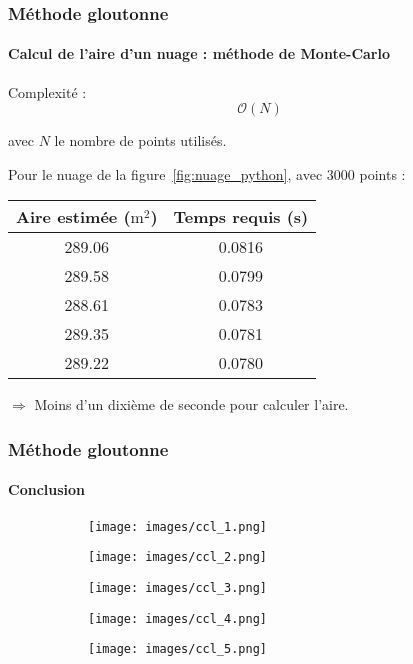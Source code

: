 \documentclass{beamer}
\begin{document}
\begin{frame}
	\frametitle{Méthode gloutonne}
	\framesubtitle{Calcul de l'aire d'un nuage : méthode de Monte-Carlo}
	Complexité : \[\mathcal{O}(N)\]
	\begin{flushright}
		avec $N$ le nombre de points utilisés.
	\end{flushright}
	Pour le nuage de la figure~\ref{fig:nuage_python}, avec $ 3000 $ points : 
	\begin{center}
		\begin{tabular}{c|c}
		Aire estimée ($\text{m}^2$) & Temps requis (s) \\ \hline \hline 
		289.06 & 0.0816 \\ 
		289.58 & 0.0799 \\ 
		288.61 & 0.0783 \\
		289.35 & 0.0781 \\
		289.22 & 0.0780 \\
	\end{tabular}
	\end{center}
	\begin{flushright}
		\small $\Rightarrow$ Moins d'un dixième de seconde pour calculer l'aire.
	\end{flushright}
\end{frame}


\begin{frame}
	\frametitle{Méthode gloutonne}
	\framesubtitle{Conclusion}
	\begin{figure}[!htb]
			\centering 
			\begin{subfigure}{0.25\textwidth}
				\centering 
				\texttt{[image: images/ccl\_1.png]}
			\end{subfigure}
			\hspace*{\fill}
			\begin{subfigure}{0.25\textwidth}
				\centering 
				\texttt{[image: images/ccl\_2.png]}
			\end{subfigure}
			\hspace*{\fill}
			\begin{subfigure}{0.25\textwidth}
				\centering 
				\texttt{[image: images/ccl\_3.png]}
			\end{subfigure}
			\hspace*{\fill}
			
		\end{figure}
		\begin{figure}[!htb]

			\centering 
			\hspace*{\fill}
			\begin{subfigure}{0.25\textwidth}
				\centering 
				\texttt{[image: images/ccl\_4.png]}
			\end{subfigure}
			\hspace*{\fill}
			\begin{subfigure}{0.25\textwidth}
				\centering 
				\texttt{[image: images/ccl\_5.png]}
			\end{subfigure}
			\hspace*{\fill}
		\end{figure}
\end{frame}
\end{document}

